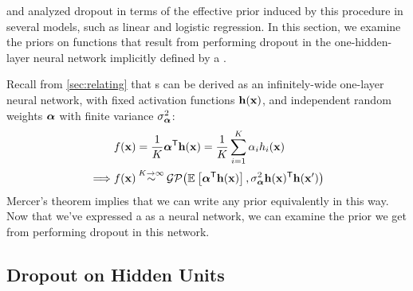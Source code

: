 \citet{baldi2013understanding} and \citet{wang2013fast} analyzed dropout in terms of the effective prior induced by this procedure in several models, such as linear and logistic regression.
In this section, we examine the priors on functions that result from performing dropout in the one-hidden-layer neural network implicitly defined by a \gp{}.

Recall from \cref{sec:relating} that \gp{}s can be derived as an infinitely-wide one-layer neural network, with fixed activation functions ${\bf{h}}({\bf{x}})$, and independent random weights $\boldsymbol{\alpha}$ with finite variance $\sigma^2_{\boldsymbol{\alpha}}$:
%
\begin{align}
& f({\bf{x}}) = \frac{1}{K}{\mathbf {\boldsymbol{\alpha}}}^{\mathsf{T}} {\bf{h}}({\bf{x}}) = \frac{1}{K} \sum_{i=1}^K \alpha_i h_i({\bf{x}})
\\
\implies & f({\bf{x}}) \mathbin{\overset{K \to \infty}{\sim}} \mathcal{GP}\!\left(\mathbb{E}_{} \left[ {\boldsymbol{\alpha}^{\mathsf{T}} {\bf{h}}({\bf{x}})} \right],\sigma^2_{\boldsymbol{\alpha}} {\bf{h}}({\bf{x}})^{\mathsf{T}}{\bf{h}}({\bf{x}}')\right)
\label{eq:one-layer-gp-two}
\end{align}
%
Mercer's theorem implies that we can write any \gp{} prior equivalently in this way.
Now that we've expressed a \gp{} as a neural network, we can examine the prior we get from performing dropout in this network.



\subsection{Dropout on Hidden Units}

